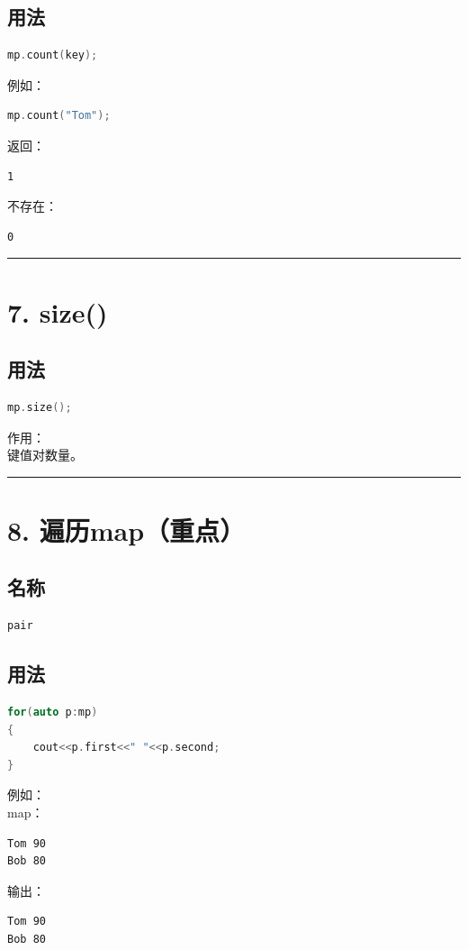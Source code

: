 \documentclass[9pt,twocolumn]{extarticle}
\begin{document}
\subsection{用法}
\begin{lstlisting}[language=C++]
mp.count(key);
\end{lstlisting}
例如：
\begin{lstlisting}[language=C++]
mp.count("Tom");
\end{lstlisting}
返回：
\begin{lstlisting}
1
\end{lstlisting}
不存在：
\begin{lstlisting}
0
\end{lstlisting}

\noindent\rule{\linewidth}{0.4pt}

\section{7. size()}

\subsection{用法}
\begin{lstlisting}[language=C++]
mp.size();
\end{lstlisting}
作用：\\
键值对数量。

\noindent\rule{\linewidth}{0.4pt}

\section{8. 遍历map（重点）}

\subsection{名称}
\begin{lstlisting}[language=C++]
pair
\end{lstlisting}

\subsection{用法}
\begin{lstlisting}[language=C++]
for(auto p:mp)
{
    cout<<p.first<<" "<<p.second;
}
\end{lstlisting}
例如：\\
map：
\begin{lstlisting}
Tom 90
Bob 80
\end{lstlisting}
输出：
\begin{lstlisting}
Tom 90
Bob 80
\end{lstlisting}
\end{document}
